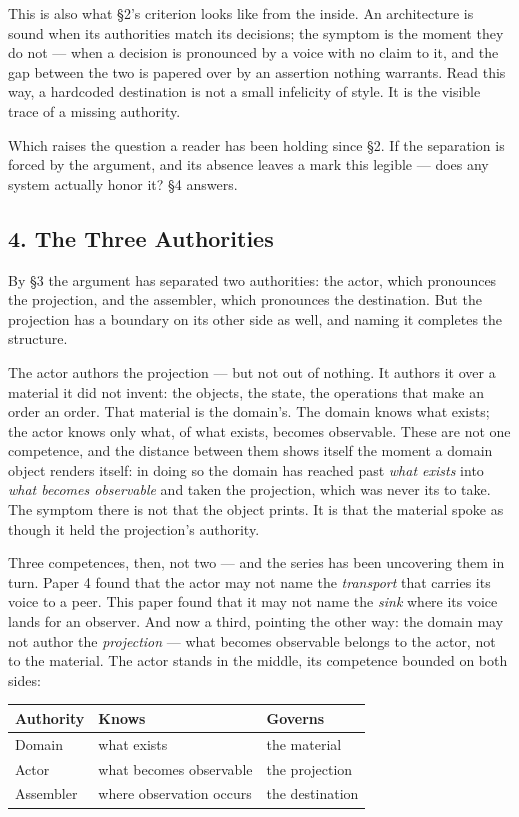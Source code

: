 \documentclass[
]{article}
\newcounter{none} %
\begin{document}
This is also what §2's criterion looks like from the inside. An
architecture is sound when its authorities match its decisions; the
symptom is the moment they do not --- when a decision is pronounced by a
voice with no claim to it, and the gap between the two is papered over
by an assertion nothing warrants. Read this way, a hardcoded destination
is not a small infelicity of style. It is the visible trace of a missing
authority.

Which raises the question a reader has been holding since §2. If the
separation is forced by the argument, and its absence leaves a mark this
legible --- does any system actually honor it? §4 answers.

\subsection{4. The Three Authorities}\label{the-three-authorities}

By §3 the argument has separated two authorities: the actor, which
pronounces the projection, and the assembler, which pronounces the
destination. But the projection has a boundary on its other side as
well, and naming it completes the structure.

The actor authors the projection --- but not out of nothing. It authors
it over a material it did not invent: the objects, the state, the
operations that make an order an order. That material is the domain's.
The domain knows what exists; the actor knows only what, of what exists,
becomes observable. These are not one competence, and the distance
between them shows itself the moment a domain object renders itself: in
doing so the domain has reached past \emph{what exists} into \emph{what
becomes observable} and taken the projection, which was never its to
take. The symptom there is not that the object prints. It is that the
material spoke as though it held the projection's authority.

Three competences, then, not two --- and the series has been uncovering
them in turn. Paper 4 found that the actor may not name the
\emph{transport} that carries its voice to a peer. This paper found that
it may not name the \emph{sink} where its voice lands for an observer.
And now a third, pointing the other way: the domain may not author the
\emph{projection} --- what becomes observable belongs to the actor, not
to the material. The actor stands in the middle, its competence bounded
on both sides:

{\def\LTcaptype{none} %
\begin{longtable}[]{@{}lll@{}}
\toprule\noalign{}
Authority & Knows & Governs \\
\midrule\noalign{}
\endhead
\bottomrule\noalign{}
\endlastfoot
Domain & what exists & the material \\
Actor & what becomes observable & the projection \\
Assembler & where observation occurs & the destination \\
\end{longtable}
}
\end{document}
